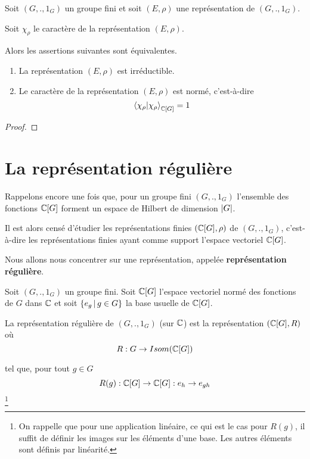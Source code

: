 \begin{corollary}
	Soit $(G, ., 1_{G})$ un groupe fini et soit $(E,
	\rho)$ une représentation de $(G, ., 1_{G})$.

	Soit $\chi_{\rho}$ le caractère de la représentation $(E,
	\rho)$.

	Alors les assertions suivantes sont équivalentes.

	\begin{enumerate}
		\item La représentation $(E,
	\rho)$ est irréductible.
		\item Le caractère de la représentation $(E, \rho)$ est
			normé, c'est-à-dire
			\begin{equation}
				\bra{\chi_{\rho}}\ket{\chi_{\rho}}_{\mathbb{C}[G]} = 1
			\end{equation}
	\end{enumerate}
\end{corollary}

\ifdefined\outputproof
\begin{proof}

\end{proof}
\fi

\section{La représentation régulière}

Rappelons encore une fois que, pour un groupe fini $(G, ., 1_{G})$ l'ensemble
des fonctions $\mathbb{C}[G]$ forment un espace de Hilbert de dimension
$|G|$.

Il est alors censé d'étudier les représentations finies $(\mathbb{C}[G],
\rho)$ de $(G, ., 1_{G})$, c'est-à-dire les
représentations finies ayant comme support l'espace vectoriel
$\mathbb{C}[G]$.

Nous allons nous concentrer sur une représentation, appelée
\textbf{représentation régulière}.

\begin{definition}
	Soit $(G, ., 1_{G})$ un groupe fini.
	Soit $\mathbb{C}[G]$ l'espace vectoriel normé
	des fonctions de $G$ dans $\mathbb{C}$ et soit $\left\{e_{g} \, | \, g \in G \right\}$ la
	base usuelle de $\mathbb{C}[G]$.

	La représentation régulière de $(G, ., 1_{G})$ (sur $\mathbb{C}$) est la
	représentation $(\mathbb{C}[G], R)$ où
	\begin{equation}
		R : G \rightarrow Isom(\mathbb{C}[G])
	\end{equation}

	tel que, pour tout $g \in G$
	\begin{equation}
		R(g) : \mathbb{C}[G] \rightarrow \mathbb{C}[G] : e_{h} \rightarrow e_{gh}
	\end{equation}\footnote{On rappelle que pour une application linéaire, ce
		qui est le cas pour $R(g)$, il suffit de définir les images sur les
	éléments d'une base. Les autres éléments sont définis par linéarité.}
\end{definition}

